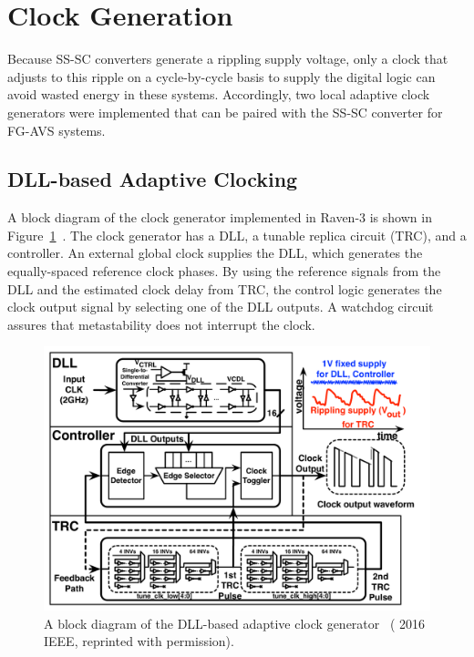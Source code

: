 \documentclass[graybox]{svmult}
\begin{document}
\section{Clock Generation}

Because SS-SC converters generate a rippling supply voltage, only a clock that adjusts to this ripple on a cycle-by-cycle basis to supply the digital logic can avoid wasted energy in these systems.
Accordingly, two local adaptive clock generators were implemented that can be paired with the SS-SC converter for FG-AVS systems.

\subsection{DLL-based Adaptive Clocking}

A block diagram of the clock generator implemented in Raven-3 is shown in Figure~\ref{fig:clockgen-block}~\cite{Kwak2016}.
The clock generator has a DLL, a tunable replica circuit (TRC), and a controller.
An external global clock supplies the DLL, which generates the equally-spaced reference clock phases.
By using the reference signals from the DLL and the estimated clock delay from TRC, the control logic generates the clock output signal by selecting one of the DLL outputs.
A watchdog circuit assures that metastability does not interrupt the clock.

\begin{figure}
  \centering
  \includegraphics[width=\textwidth]{clockgen-block}
  \caption{A block diagram of the DLL-based adaptive clock generator~\cite{Zimmer2016} ({\textcopyright} 2016 IEEE, reprinted with permission).}
  \label{fig:clockgen-block}
\end{figure}
\end{document}
